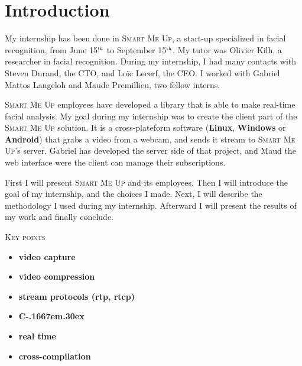 \documentclass[a4paper,11pt]{custom}
\newcommand{\smu}{\textsc{Smart Me Up}\xspace}
\newcommand{\linux}{\textbf{Linux}\xspace}
\newcommand{\win}{\textbf{Windows}\xspace}
\newcommand{\android}{\textbf{Android}\xspace}
\newcommand{\nth}[1]{#1$^{\text{\tiny th}\xspace}$}
\newcommand{\cpp}{%
  C\kern-.1667em\raise.30ex\hbox{\smaller{++}}%
  \spacefactor1000\xspace%
}
\begin{document}


\chapter{Introduction}

My internship has been done in \smu, a start-up specialized in facial
recognition, from June \nth{15} to September \nth{15}. My tutor was Olivier
Kilh, a researcher in facial recognition. During my internship, I had many
contacts with Steven Durand, the CTO, and Loïc Lecerf, the CEO. I worked with
Gabriel Mattos Langeloh and Maude Premillieu, two fellow interns.

\smu{} employees have developed a library that is able to make
real-time facial analysis. My goal during my internship was to create the
client part of the \smu solution. It is a cross-plateform software (\linux,
\win{} or \android) that grabs a video from a webcam, and sends it
stream to \smu's server. Gabriel has developed the server side of that project,
and Maud the web interface were the client can manage their subscriptions.

First I will present \smu{} and its employees. Then I will introduce the goal of
my internship, and the choices I made. Next, I will describe the
methodology I used during my internship. Afterward I will present the
results of my work and finally conclude.

\vspace{\fill}

\begin{center}
\textsc{\textsc{Key points}}
\end{center}

\begin{multicols}{2}
\begin{itemize}
\item \textbf{video capture}
\item \textbf{video compression}
\item \textbf{stream protocols (rtp, rtcp)}
\item \textbf{\cpp}
\item \textbf{real time}
\item \textbf{cross-compilation}
\end{itemize}
\end{multicols}
\end{document}
